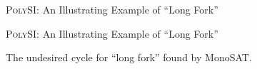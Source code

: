 \begin{frame}{\textsc{PolySI}: An Illustrating Example of ``Long Fork''}
	\begin{center}
	\end{center}
\end{frame}

\begin{frame}{\textsc{PolySI}: An Illustrating Example of ``Long Fork''}
	\begin{center}
		The undesired cycle for ``long fork'' found by MonoSAT.
	\end{center}
\end{frame}
